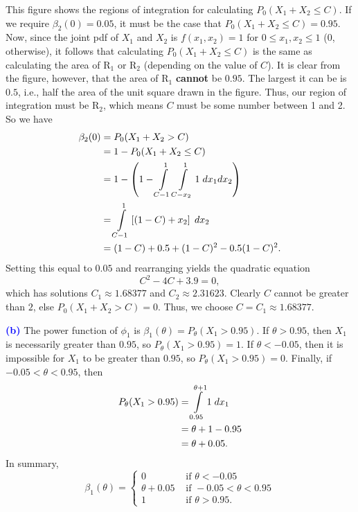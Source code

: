 \documentclass[12pt]{article}
\begin{document}
\noindent This figure shows the regions of integration for calculating $P_0(X_1 + X_2 \leq C)$.  If we require $\beta_2(0) = 0.05$, it must be the case that $P_0(X_1 + X_2 \leq C) = 0.95$.  Now, since the joint pdf of $X_1$ and $X_2$ is $f(x_1, x_2) = 1$ for $0 \leq x_1, x_2 \leq 1$ ($0$, otherwise), it follows that calculating $P_0(X_1 + X_2 \leq C)$ is the same as calculating the area of \textbf{$\text{R}_1$} or \textbf{$\text{R}_2$} (depending on the value of $C$). It is clear from the figure, however, that the area of \textbf{$\text{R}_1$} \textbf{cannot} be $0.95$.  The largest it can be is $0.5$, i.e., half the area of the unit square drawn in the figure. Thus, our region of integration must be \textbf{$\text{R}_2$}, which means $C$ must be some number between 1 and 2. So we have
\begin{align}
\beta_2(0) &= P_0(X_1 + X_2 > C) \\
&= 1 - P_0(X_1 + X_2 \leq C) \\
&= 1 - \left(1 - \int\limits_{C-1}^1\int\limits_{C-x_2}^1 1 \hspace{1mm} dx_1 dx_2\right) \\
&= \int\limits_{C-1}^1 \left[(1-C)+x_2\right] \hspace{1mm} dx_2 \\
&= (1-C) + 0.5 + (1-C)^2 - 0.5(1-C)^2.
\end{align}
Setting this equal to $0.05$ and rearranging yields the quadratic equation $$C^2 -4C +3.9 =0,$$ which has solutions $C_1 \approx 1.68377$ and $C_2 \approx 2.31623.$ Clearly $C$ cannot be greater than $2$, else $P_0(X_1 + X_2 > C) = 0$.  Thus, we choose $C = C_1 \approx 1.68377.$ 

\vspace{3mm}

\noindent \textcolor{blue}{\textbf{(b)}} The power function of $\phi_1$ is $\beta_1(\theta) = P_{\theta}(X_1 > 0.95).$  If $\theta > 0.95$, then $X_1$ is necessarily greater than $0.95$, so $P_\theta(X_1 > 0.95) = 1$.  If $\theta < -0.05$, then it is impossible for $X_1$ to be greater than $0.95$, so $P_\theta(X_1 > 0.95) = 0$. Finally, if $-0.05 < \theta < 0.95$, then 
\begin{align}
P_\theta(X_1 > 0.95) &= \int\limits_{0.95}^{\theta + 1} 1 \hspace{1mm} dx_1 \\
& = \theta + 1 - 0.95 \\
&= \theta + 0.05.
\end{align}
In summary, 
$$\beta_1(\theta) = 
\begin{cases}
0 & \text{ if } \theta < -0.05 \\
\theta + 0.05 & \text{ if } -0.05 < \theta < 0.95 \\
1 & \text{ if } \theta > 0.95.
\end{cases}
$$
\end{document}
